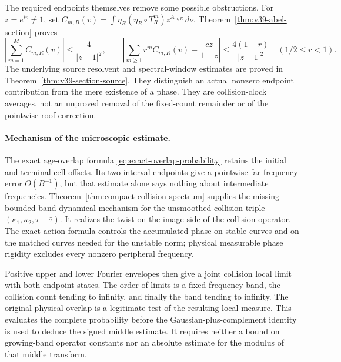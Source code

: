 \documentclass[11pt,reqno]{amsart}
\numberwithin{equation}{section}
\theoremstyle{definition}\newtheorem{definition}[theorem]{Definition}
\theoremstyle{remark}\newtheorem{remark}[theorem]{Remark}
\begin{document}
The required endpoints themselves remove some possible obstructions.
For $z=e^{iv}\ne1$, set
$C_{m,R}(v)=\int\eta_R(\eta_R\circ T_R^m)z^{A_{m,R}}\,d\nu$.
Theorem~\ref{thm:v39-abel-section} proves
\[
 \left|\sum_{m=1}^M C_{m,R}(v)\right|\le\frac4{|z-1|^2},\qquad
 \left|\sum_{m\ge1}r^m C_{m,R}(v)-\frac{cz}{1-z}\right|
       \le\frac{4(1-r)}{|z-1|^2}\quad(1/2\le r<1).
\]
The underlying source resolvent and spectral-window estimates are
proved in Theorem~\ref{thm:v39-section-source}. They distinguish an
actual nonzero endpoint contribution from the mere existence of a
phase. They are collision-clock averages, not an unproved removal of
the fixed-count remainder or of the pointwise roof correction.

\paragraph{Mechanism of the microscopic estimate.}
The exact age-overlap formula
\eqref{eq:exact-overlap-probability} retains the initial and terminal
cell offsets. Its two interval endpoints give a pointwise far-frequency
error $O(B^{-1})$, but that estimate alone says nothing about intermediate
frequencies. Theorem~\ref{thm:compact-collision-spectrum} supplies the
missing bounded-band dynamical mechanism for the unsmoothed collision
triple $(\kappa_1,\kappa_2,\tau-\bar\tau)$. It realizes the twist on
the image side of the collision operator. The exact action formula
controls the accumulated phase on stable curves and on the matched
curves needed for the unstable norm; physical measurable phase rigidity
excludes every nonzero peripheral frequency.

Positive upper and lower Fourier envelopes then give a joint collision
local limit with both endpoint states. The order of limits is a fixed
frequency band, the collision count tending to infinity, and finally
the band tending to infinity. The original physical overlap is a
legitimate test of the resulting local measure. This evaluates the
complete probability before the Gaussian-plus-complement identity is
used to deduce the signed middle estimate. It requires neither a bound
on growing-band operator constants nor an absolute estimate for the
modulus of that middle transform.
\end{document}

